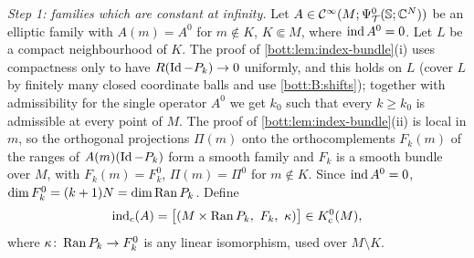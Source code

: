 \emph{Step 1: families which are constant at infinity.} Let
$A\in\mathcal{C}^\infty(M;\Psi^{0}_{\mathcal{T}}(\mathbb{S};\mathbb{C}^N))$ be an elliptic family with $A(m)=A^0$ for $m\notin K$,
$K\Subset M$, where $\operatorname{ind} A^0=0$. Let $L$ be a compact neighbourhood of $K$. The proof of
\cref{bott:lem:index-bundle}(i) uses compactness only to have $R(\operatorname{Id}-P_k)\to0$ uniformly,
and this holds on $L$ (cover $L$ by finitely many closed coordinate balls and use
\ref{bott:B:shifts}); together with admissibility for the single operator $A^0$ we get $k_0$
such that every $k\ge k_0$ is admissible at every point of $M$. The proof of
\cref{bott:lem:index-bundle}(ii) is local in $m$, so the orthogonal projections $\Pi(m)$
onto the orthocomplements $F_k(m)$ of the ranges of $A(m)(\operatorname{Id}-P_k)$ form a smooth family and
$F_k$ is a smooth bundle over $M$, with $F_k(m)=F^0_k$, $\Pi(m)=\Pi^0$ for $m\notin K$. Since
$\operatorname{ind} A^0=0$, $\dim F_k^0=(k+1)N=\dim\operatorname{Ran} P_k$. Define
\begin{equation*}
  \ind_c(A)=\bigl[(M\times\Ran P_k,\ F_k,\ \kappa)\bigr]\in\Kc^0(M),
\end{equation*}
where $\kappa\colon\operatorname{Ran} P_k\to F_k^0$ is any linear isomorphism, used over $M\setminus K$.
